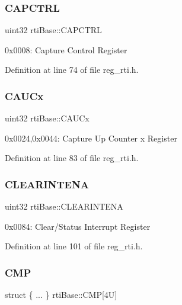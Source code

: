 \subsubsection{\texorpdfstring{C\+A\+P\+C\+T\+RL}{CAPCTRL}}
{\footnotesize\ttfamily uint32 rti\+Base\+::\+C\+A\+P\+C\+T\+RL}

0x0008\+: Capture Control Register 

Definition at line 74 of file reg\+\_\+rti.\+h.

\mbox{\label{structrtiBase_a2943137a2b7d0f6159c3aaced7ebb350}} 
\subsubsection{\texorpdfstring{C\+A\+U\+Cx}{CAUCx}}
{\footnotesize\ttfamily uint32 rti\+Base\+::\+C\+A\+U\+Cx}

0x0024,0x0044\+: Capture Up Counter x Register 

Definition at line 83 of file reg\+\_\+rti.\+h.

\mbox{\label{structrtiBase_a6cd3aab94d9ef65de73218617f320ec6}} 
\subsubsection{\texorpdfstring{C\+L\+E\+A\+R\+I\+N\+T\+E\+NA}{CLEARINTENA}}
{\footnotesize\ttfamily uint32 rti\+Base\+::\+C\+L\+E\+A\+R\+I\+N\+T\+E\+NA}

0x0084\+: Clear/\+Status Interrupt Register 

Definition at line 101 of file reg\+\_\+rti.\+h.

\mbox{\label{structrtiBase_aef07d6a16e2ce2119e7aa1b8c9e4a7d8}} 
\subsubsection{\texorpdfstring{C\+MP}{CMP}}
{\footnotesize\ttfamily struct \{ ... \}   rti\+Base\+::\+C\+MP\mbox{[}4\+U\mbox{]}}

